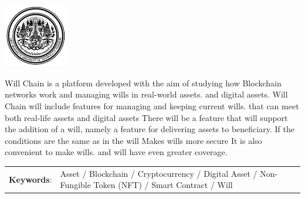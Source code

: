 \documentclass[12pt,oneside,openright,a4paper]{cpe-thai-project}
\begin{document}
\pdfstringdefDisableCommands{%
\let\MakeUppercase\relax
}

\begin{center}
  \includegraphics[width=2.8cm]{logo02.jpg}
\end{center}
\vspace*{-1cm}

\maketitlepage
\makesignaturepage 

\abstract

Will Chain is a platform developed with the aim of studying how Blockchain networks work and managing wills in real-world assets. and digital assets. Will Chain will include features for managing and keeping current wills. that can meet both real-life assets and digital assets There will be a feature that will support the addition of a will, namely a feature for delivering assets to beneficiary. If the conditions are the same as in the will Makes wills more secure It is also convenient to make wills. and will have even greater coverage.

\begin{flushleft}
\begin{tabular*}{\textwidth}{@{}lp{}}
\textbf{Keywords}: & Asset / Blockchain / Cryptocurrency / Digital Asset / Non-Fungible Token (NFT) /  Smart Contract / Will 
\end{tabular*}
\end{flushleft}
\endabstract

\newcommand\tab[1][1cm]{\hspace*{#1}}
\thaiabstract
\end{document}
